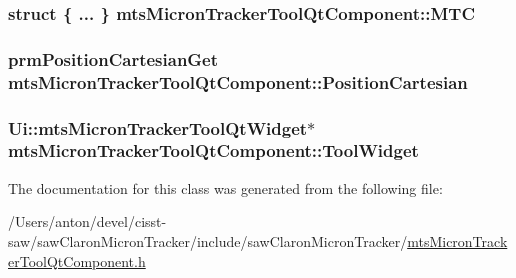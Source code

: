 \subsubsection[{M\+T\+C}]{\setlength{\rightskip}{0pt plus 5cm}struct \{ ... \}   mts\+Micron\+Tracker\+Tool\+Qt\+Component\+::\+M\+T\+C\hspace{0.3cm}{\ttfamily [protected]}}\label{classmts_micron_tracker_tool_qt_component_ac9dad5a29fce9eee8f3af30cdaf41ddf}
\hypertarget{classmts_micron_tracker_tool_qt_component_a9ce46838a73866850a7a06a339b4d121}{}
\subsubsection[{Position\+Cartesian}]{\setlength{\rightskip}{0pt plus 5cm}prm\+Position\+Cartesian\+Get mts\+Micron\+Tracker\+Tool\+Qt\+Component\+::\+Position\+Cartesian}\label{classmts_micron_tracker_tool_qt_component_a9ce46838a73866850a7a06a339b4d121}
\hypertarget{classmts_micron_tracker_tool_qt_component_a78d45496b35b856b483e6600599dc4a4}{}
\subsubsection[{Tool\+Widget}]{\setlength{\rightskip}{0pt plus 5cm}Ui\+::mts\+Micron\+Tracker\+Tool\+Qt\+Widget$\ast$ mts\+Micron\+Tracker\+Tool\+Qt\+Component\+::\+Tool\+Widget\hspace{0.3cm}{\ttfamily [protected]}}\label{classmts_micron_tracker_tool_qt_component_a78d45496b35b856b483e6600599dc4a4}


The documentation for this class was generated from the following file\+:\begin{DoxyCompactItemize}
\item 
/\+Users/anton/devel/cisst-\/saw/saw\+Claron\+Micron\+Tracker/include/saw\+Claron\+Micron\+Tracker/\hyperlink{mts_micron_tracker_tool_qt_component_8h}{mts\+Micron\+Tracker\+Tool\+Qt\+Component.\+h}\end{DoxyCompactItemize}

